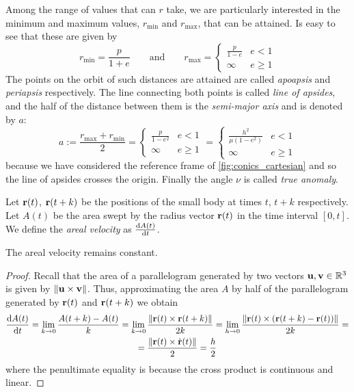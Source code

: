 \documentclass[../main.tex]{subfiles}
\begin{document}
Among the range of values that can $r$ take, we are particularly interested in the minimum and maximum values, $r_\mathrm{min}$ and $r_\mathrm{max}$, that can be attained. Is easy to see that these are given by
\begin{equation}
  r_\mathrm{min}=\frac{p}{1+e}\qquad\text{and}\qquad r_\mathrm{max}=
  \begin{cases}
    \displaystyle\frac{p}{1-e} & e<1     \\
    \infty                     & e\geq 1
  \end{cases}
\end{equation}
The points on the orbit of such distances are attained are called \emph{apoapsis} and \emph{periapsis} respectively. The line connecting both points is called \emph{line of apsides}, and the half of the distance between them is the \emph{semi-major axis} and is denoted by $a$:
\begin{equation}\label{eq:semi-major_axis}
  a:=\frac{r_\mathrm{max}+r_\mathrm{min}}{2}=
  \begin{cases}
    \displaystyle\frac{p}{1-e^2} & e<1     \\
    \infty                       & e\geq 1
  \end{cases}=
  \begin{cases}
    \displaystyle\frac{h^2}{\mu(1-e^2)} & e<1     \\
    \infty                              & e\geq 1
  \end{cases}
\end{equation}
because we have considered the reference frame of \cref{fig:conics_cartesian} and so the line of apsides crosses the origin. Finally the angle $\nu$ is called \emph{true anomaly}.
\begin{definition}
  Let $\boldsymbol{\mathrm{r}}(t)$, $\boldsymbol{\mathrm{r}}(t+k)$ be the positions of the small body at times $t$, $t+k$ respectively. Let $A(t)$ be the area swept by the radius vector $\boldsymbol{\mathrm{r}}(t)$ in the time interval $[0,t]$. We define the \emph{areal velocity} as $\dv{A(t)}{t}$.
\end{definition}
\begin{proposition}
  The areal velocity remains constant.
\end{proposition}
\begin{proof}
  Recall that the area of a parallelogram generated by two vectors $\boldsymbol{\mathrm{u}},\boldsymbol{\mathrm{v}}\in\mathbb{R}^3$ is given by $\left\|\boldsymbol{\mathrm{u}}\times\boldsymbol{\mathrm{v}}\right\|$. Thus, approximating the area $A$ by half of the parallelogram generated by $\boldsymbol{\mathrm{r}}(t)$ and ${\boldsymbol{\mathrm{r}}}(t+k)$ we obtain
  \begin{multline}\label{eq:areal_velocity}
    \dv{A(t)}{t}=\lim_{k\to 0}\frac{A(t+k)-A(t)}{k}=\lim_{k\to 0}\frac{\left\|\boldsymbol{\mathrm{r}}(t)\times\boldsymbol{\mathrm{r}}(t+k)\right\|}{2k}=\lim_{h\to 0}\frac{\left\|\boldsymbol{\mathrm{r}}(t)\times(\boldsymbol{\mathrm{r}}(t+k)-\boldsymbol{\mathrm{r}}(t))\right\|}{2k}=\\
    =\frac{\left\|\boldsymbol{\mathrm{r}}(t)\times\dot{\boldsymbol{\mathrm{r}}}(t)\right\|}{2}=\frac{h}{2}
  \end{multline}
  where the penultimate equality is because the cross product is continuous and linear.
\end{proof}
\end{document}
